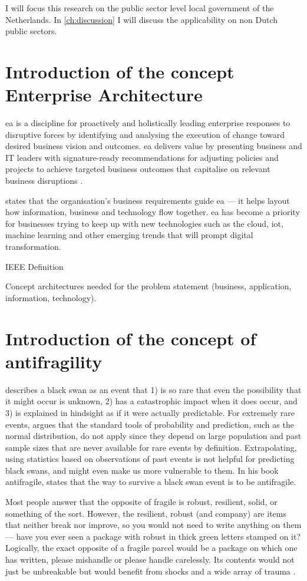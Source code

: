 I will focus this research on the public sector level local government of the Netherlands. In \cref{ch:discussion} I will discuss the applicability on non Dutch public sectors.

\section{Introduction of the concept Enterprise Architecture}
\label{introea}
\acrfull{ea} is a discipline for proactively and holistically leading enterprise responses to disruptive forces by identifying and analysing the execution of change toward desired business vision and outcomes. \acrshort{ea} delivers value by presenting business and IT leaders with signature-ready recommendations for adjusting policies and projects to achieve targeted business outcomes that capitalise on relevant business disruptions \parencite{Gartner}.

\textcite{White2018} states that the organisation’s business requirements guide \acrshort{ea} — it helps layout how information, business and technology flow together. \acrshort{ea} has become a priority for businesses trying to keep up with new technologies such as the cloud, \acrfull{iot}, machine learning and other emerging trends that will prompt digital transformation.

IEEE Definition

Concept architectures needed for the problem statement (business, application, information, technology).

\section{Introduction of the concept of antifragility}
\label{sec:introantifragility}
\textcite{Taleb2008} describes a black swan as an event that 1) is so rare that even the possibility that it might occur is unknown, 2) has a catastrophic impact when it does occur, and 3) is explained in hindsight as if it were actually predictable. For extremely rare events, \citeauthor{Taleb2008} argues that the standard tools of probability and prediction, such as the normal distribution, do not apply since they depend on large population and past sample sizes that are never available for rare events by definition. Extrapolating, using statistics based on observations of past events is not helpful for predicting black swans, and might even make us more vulnerable to them. In his book \Gls{antifragile}, \textcite{Taleb2012} states that the way to survive a black swan event is to be \gls{antifragile}.\par
Most people answer that the opposite of \gls{fragile} is \gls{robust}, \gls{resilient}, solid, or something of the sort. However, the \gls{resilient}, \gls{robust} (and company) are items that neither break nor improve, so you would not need to write anything on them — have you ever seen a package with \gls{robust} in thick green letters stamped on it? Logically, the exact opposite of a \gls{fragile} parcel would be a package on which one has written, please mishandle or please handle carelessly. Its contents would not just be unbreakable but would benefit from shocks and a wide array of trauma \parencite{Taleb2012}.

